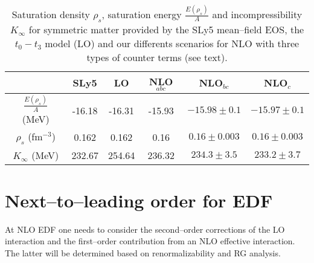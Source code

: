 \documentclass[aps,11pt,prc,preprint,superscriptaddress,nofootinbib]{revtex4}
\begin{document}
\begin{center}
\begin{table}[htbp]
\begin{center}
\begin{tabular}{|c|c|c|c|c|c|}
\hline
& SLy5 & LO & NLO$_{abc}$& NLO$_{bc}$ & NLO$_c$ \\ \hline
$\frac{E(\rho_s)}{A}$ (MeV)& -16.18 & -16.31 & -15.93 & $-15.98\pm0.1$ & $-15.97\pm0.1$ \\ \hline
$\rho_s$ (fm$^{-3}$)& 0.162 & 0.162 & 0.16 & $0.16\pm0.003$ & $0.16\pm0.003$ \\ \hline
$K_{\infty}$ (MeV)& 232.67 & 254.64 & 236.32 & $234.3\pm3.5$ & $233.2\pm3.7$ \\ \hline
\end{tabular}%
\end{center}
\caption{Saturation density $\rho_s$, saturation energy $\frac{E(\rho_s)}{A}$  and incompressibility $K_{\infty}$ for symmetric matter provided by the SLy5 mean--field EOS, the $t_0-t_3$ model (LO) and our differents scenarios for NLO with three types of counter terms (see text). }
\label{k}
\end{table}
\end{center} 


\section{Next--to--leading order for EDF}

At NLO EDF one needs to consider the second--order corrections of the LO
interaction and the first--order contribution from an NLO effective interaction. 
The latter will be determined based on renormalizability and RG
analysis. 
\end{document}
